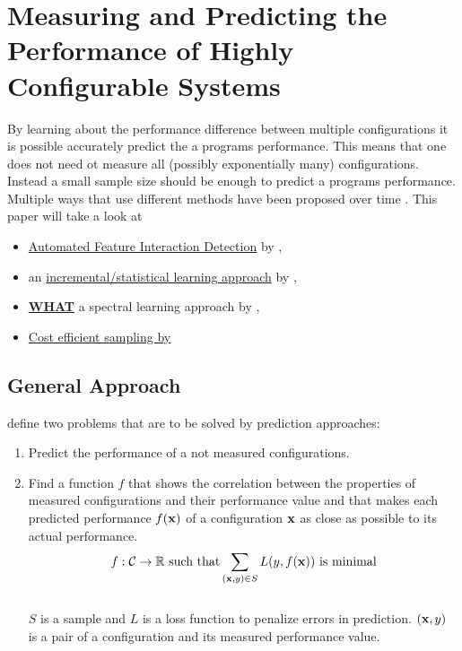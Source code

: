 \section{Measuring and Predicting the Performance of Highly Configurable Systems}\label{sec:measuring}

By learning about the performance difference between multiple configurations it is possible accurately predict the a programs performance. This means that one does not need ot measure all (possibly exponentially many) configurations. Instead a small sample size should be enough to predict a programs performance. Multiple ways that use different methods have been proposed over time \cite{FasterDiscoveryofFasterSystemConfigurationsSiegmund2017}. This paper will take a look at
\begin{itemize}
	\item \hyperref[sec:AFID]{Automated Feature Interaction Detection} by \citet{AutomatedFeatureDetectionSiegmund2012},
	\item an \hyperref[sec:VAPP]{incremental/statistical learning approach} by \citet{VariabilityAwarePerformancePredictionJianmeiSigmundApel},
	\item \hyperref[sec:WHAT]{\textbf{WHAT}} a spectral learning approach by \citet{FasterDiscoveryofFasterSystemConfigurationsSiegmund2017},
	\item \hyperref[sec:ProjectiveSampling]{Cost efficient sampling by \cite{CostEfficientSampling_Gou_Siegmund_2015}}
\end{itemize}

\subsection{General Approach}

\citet{VariabilityAwarePerformancePredictionJianmeiSigmundApel} define two problems that are to be solved by prediction approaches:
\begin{enumerate}
	\item Predict the performance of a not measured configurations.
	\item Find a function $f$ that shows the correlation between the properties of measured configurations and their performance value and that makes each predicted performance $f(\mathrm{\mathbf{x}})$ of a configuration $\mathrm{\mathbf{x}}$ as close as possible to its actual performance.\\	
	\begin{equation}
	f : \mathcal{C} \rightarrow  \mathbb{R} \text{ such that} \sum_{(\mathrm{\mathbf{x}},y) \in S} L(y,f(\mathrm{\mathbf{x}})) \text{ is minimal}
	\end{equation}\\
	$S$ is a sample and	$L$ is a loss function to penalize errors in prediction. $(\mathrm{\mathbf{x}},y)$ is a pair of a configuration and its measured performance value.
\end{enumerate}

